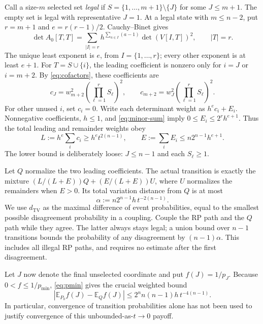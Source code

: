 \documentclass[10pt,letterpaper]{article}
\newcommand{\E}{\mathbb E}
\newcommand{\TV}{d_{\mathrm{TV}}}
\begin{document}
Call a size-$m$ selected set \emph{legal} if
$S=\{1,\ldots,m+1\}\setminus\{J\}$ for some $J\leq m+1$.
The empty set is legal with representative $J=1$. At a legal state with
$m\leq n-2$, put $r=m+1$ and $e=r(r-1)/2$. Cauchy--Binet gives
\begin{equation}\label{eq:cb}
 \det A_0[T,T]=\sum_{|I|=r}
 h^{\sum_{a\in I}(a-1)}\det(V[I,T])^2,
 \qquad |T|=r.
\end{equation}
The unique least exponent is $e$, from $I=\{1,\ldots,r\}$;
every other exponent is at least $e+1$. For $T=S\cup\{i\}$, the
leading coefficient is nonzero only for $i=J$ or $i=m+2$.
By \eqref{eq:cofactors}, these coefficients are
\begin{equation}\label{eq:leading}
 c_J=w_{m+2}^2\left(\prod_{\ell=1}^r S_\ell\right)^2,
 \qquad
 c_{m+2}=w_J^2\left(\prod_{\ell=1}^r S_\ell\right)^2.
\end{equation}
For other unused $i$, set $c_i=0$. Write each determinant weight as
$h^e c_i+E_i$. Nonnegative coefficients, $h\leq1$, and
\eqref{eq:minor-sum} imply $0\leq E_i\leq2^rh^{e+1}$.
Thus the total leading and remainder weights obey
\begin{equation}\label{eq:leading-remainder}
 L:=h^e\sum_i c_i\geq h^e t^{2(n-1)},\qquad
 E:=\sum_iE_i\leq n2^{n-1}h^{e+1}.
\end{equation}
The lower bound is deliberately loose: $J\leq n-1$ and each $S_\ell\geq1$.

Let $Q$ normalize the two leading coefficients. The actual transition is
exactly the mixture $(L/(L+E))Q+(E/(L+E))U$, where $U$ normalizes the
remainders when $E>0$. Its total variation distance from $Q$ is at most
\begin{equation}\label{eq:alpha}
 \alpha:=n2^{n-1}h\,t^{-2(n-1)}.
\end{equation}
We use $\TV$ as the maximal difference of event probabilities, equal to
the smallest possible disagreement probability in a coupling. Couple
the RP path and the $Q$ path while they agree. The latter always stays
legal; a union bound over $n-1$ transitions bounds the probability of any
disagreement by $(n-1)\alpha$. This includes all illegal RP paths, and
requires no estimate after the first disagreement.

Let $J$ now denote the final unselected coordinate and put $f(J)=1/p_J$.
Because $0<f\leq1/p_{\min}$, \eqref{eq:pmin} gives the crucial weighted
bound
\begin{equation}\label{eq:hierarchy-error}
 \left|\E_{P_0}f(J)-\E_Q f(J)\right|
 \leq2^n n(n-1)h\,t^{-4(n-1)}.
\end{equation}
In particular, convergence of transition probabilities alone has not
been used to justify convergence of this unbounded-as-$t\to0$ payoff.
\end{document}
